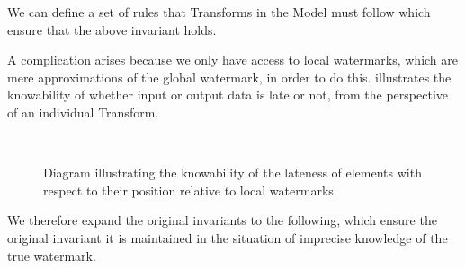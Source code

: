 We can define a set of rules that Transforms in the Model must follow which ensure that the above invariant holds.

A complication arises because we only have access to local watermarks, which are mere approximations of the global watermark, in order to do this.
 illustrates the knowability of whether input or output data is late or not, from the perspective of an individual Transform.

\begin{figure}[t]
	\\
	\caption{Diagram illustrating the knowability of the lateness of elements with respect to their position relative to local watermarks.}
	\label{fig:impl:lateness-knowability}
\end{figure}


We therefore expand the original invariants to the following, which ensure the original invariant it is maintained in the situation of imprecise knowledge of the true watermark.



